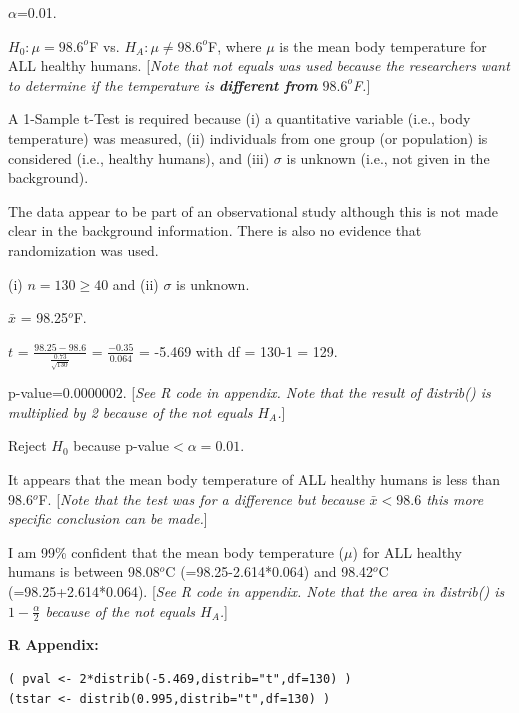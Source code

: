 \documentclass[10pt,openany]{book}\usepackage[]{graphicx}\usepackage[]{color}
\makeatletter
\newenvironment{kframe}{%
 \def\at@end@of@kframe{}%
 \ifinner\ifhmode%
  \def\at@end@of@kframe{\end{minipage}}%
  \begin{minipage}{\columnwidth}%
 \fi\fi%
 \def\FrameCommand##1{\hskip\@totalleftmargin \hskip-\fboxsep
 \colorbox{shadecolor}{##1}\hskip-\fboxsep
     \hskip-\linewidth \hskip-\@totalleftmargin \hskip\columnwidth}%
 \MakeFramed {\advance\hsize-\width
   \@totalleftmargin\z@ \linewidth\hsize
   \@setminipage}}%
 {\par\unskip\endMakeFramed%
 \at@end@of@kframe}
\newenvironment{knitrout}{}{} %
\makeatother
\begin{document}
\begin{Enumerate}
  \item $\alpha$=0.01.
  \item $H_{0}:\mu=98.6^{o}$F vs. $H_{A}:\mu\neq98.6^{o}$F, where $\mu$ is the mean body temperature for ALL healthy humans. [\textit{Note that not equals was used because the researchers want to determine if the temperature is \textbf{different from} $98.6^{o}$F.}]
  \item A 1-Sample t-Test is required because (i) a quantitative variable (i.e., body temperature) was measured, (ii) individuals from one group (or population) is considered (i.e., healthy humans), and (iii) $\sigma$ is unknown (i.e., not given in the background).
  \item The data appear to be part of an observational study although this is not made clear in the background information. There is also no evidence that randomization was used.
  \item (i) $n=130\geq40$ and (ii) $\sigma$ is unknown.
  \item $\bar{x}$ = 98.25$^{o}$F.
  \item $t$ = $\frac{98.25-98.6}{\frac{0.73}{\sqrt{130}}}$ = $\frac{-0.35}{0.064}$ = -5.469 with df = 130-1 = 129.
  \item p-value=$0.0000002$. [\textit{See R code in appendix. Note that the result of \r{distrib()} is multiplied by 2 because of the not equals $H_{A}$.}]
  \item Reject $H_{0}$ because p-value$<\alpha=0.01$.
  \item It appears that the mean body temperature of ALL healthy humans is less than 98.6$^{o}$F. [\textit{Note that the test was for a difference but because $\bar{x}<98.6$ this more specific conclusion can be made.}]
  \item I am 99\% confident that the mean body temperature ($\mu$) for ALL healthy humans is between 98.08$^{o}$C (=98.25-2.614*0.064) and 98.42$^{o}$C (=98.25+2.614*0.064). [\textit{See R code in appendix. Note that the area in \r{distrib()} is $1-\frac{\alpha}{2}$ because of the not equals $H_{A}$.}]
\end{Enumerate}

\begin{minipage}{\textwidth}
\textbf{R Appendix:}
\vspace*{-6pt}
\begin{knitrout}
\color{fgcolor}\begin{kframe}
\begin{verbatim}
( pval <- 2*distrib(-5.469,distrib="t",df=130) )
(tstar <- distrib(0.995,distrib="t",df=130) )
\end{verbatim}
\end{kframe}
\end{knitrout}
\end{minipage}







%    
\end{document}
